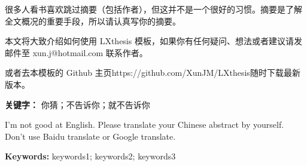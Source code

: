 \thispagestyle{empty}
\begin{cnabstract}
	很多人看书喜欢跳过摘要（包括作者），但这并不是一个很好的习惯。摘要是了解全文概况的重要手段，所以请认真写你的摘要。
	
	本文将大致介绍如何使用 LXthesis 模板，如果你有任何疑问、想法或者建议请发邮件至 {\sf xun.j@hotmail.com} 联系作者。
	
	或者去本模板的 Github 主页{\sf https://github.com/XunJM/LXthesis}随时下载最新版本。
	
	\noindent	
	\textbf{关键字：} 你猜；不告诉你；就不告诉你
\end{cnabstract}
\clearpage\thispagestyle{empty}
\begin{enabstract}\sf
	I'm not good at English. Please translate your Chinese abstract by yourself. Don't use Baidu translate or Google translate.
	
	\noindent
	\textbf{Keywords:} keywords1; keywords2; keywords3

\end{enabstract}